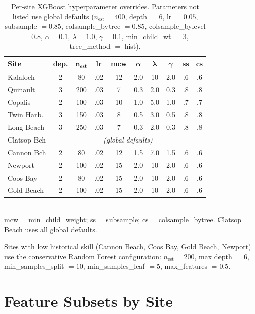 \documentclass[toxins,article,submit,moreauthors]{Definitions/mdpi}
\begin{document}
\begin{table}[H]
\caption{Per-site XGBoost hyperparameter overrides. Parameters not listed use global defaults ($n_{\text{est}} = 400$, depth $= 6$, lr $= 0.05$, subsample $= 0.85$, colsample\_bytree $= 0.85$, colsample\_bylevel $= 0.8$, $\alpha = 0.1$, $\lambda = 1.0$, $\gamma = 0.1$, min\_child\_wt $= 3$, tree\_method $=$ hist).}
\label{tab:app-xgb}
\centering\scriptsize
\begin{tabular*}{\linewidth}{@{\extracolsep{\fill}}lccccccccc}
\toprule
\textbf{Site} & \textbf{dep.} & $\boldsymbol{n_{\text{est}}}$ & \textbf{lr} & \textbf{mcw} & $\boldsymbol{\alpha}$ & $\boldsymbol{\lambda}$ & $\boldsymbol{\gamma}$ & \textbf{ss} & \textbf{cs} \\
\midrule
Kalaloch     & 2 & 80  & .02 & 12 & 2.0 & 10  & 2.0 & .6 & .6 \\
Quinault     & 3 & 200 & .03 & 7  & 0.3 & 2.0 & 0.3 & .8 & .8 \\
Copalis      & 2 & 100 & .03 & 10 & 1.0 & 5.0 & 1.0 & .7 & .7 \\
Twin Harb.   & 3 & 150 & .03 & 8  & 0.5 & 3.0 & 0.5 & .8 & .8 \\
Long Beach   & 3 & 250 & .03 & 7  & 0.3 & 2.0 & 0.3 & .8 & .8 \\
Clatsop Bch  & \multicolumn{9}{c}{\textit{(global defaults)}} \\
Cannon Bch   & 2 & 80  & .02 & 12 & 1.5 & 7.0 & 1.5 & .6 & .6 \\
Newport      & 2 & 100 & .02 & 15 & 2.0 & 10  & 2.0 & .6 & .6 \\
Coos Bay     & 2 & 80  & .02 & 15 & 2.0 & 10  & 2.0 & .6 & .6 \\
Gold Beach   & 2 & 100 & .02 & 15 & 2.0 & 10  & 2.0 & .6 & .6 \\
\bottomrule
\end{tabular*}
\vspace{0.3em}\\
\footnotesize{mcw = min\_child\_weight; ss = subsample; cs = colsample\_bytree. Clatsop Beach uses all global defaults.}
\end{table}

Sites with low historical skill (Cannon Beach, Coos Bay, Gold Beach, Newport) use the conservative Random Forest configuration: $n_{\text{est}} = 200$, max depth $= 6$, min\_samples\_split $= 10$, min\_samples\_leaf $= 5$, max\_features $= 0.5$.

\section{Feature Subsets by Site}
\label{app:features}
\end{document}
